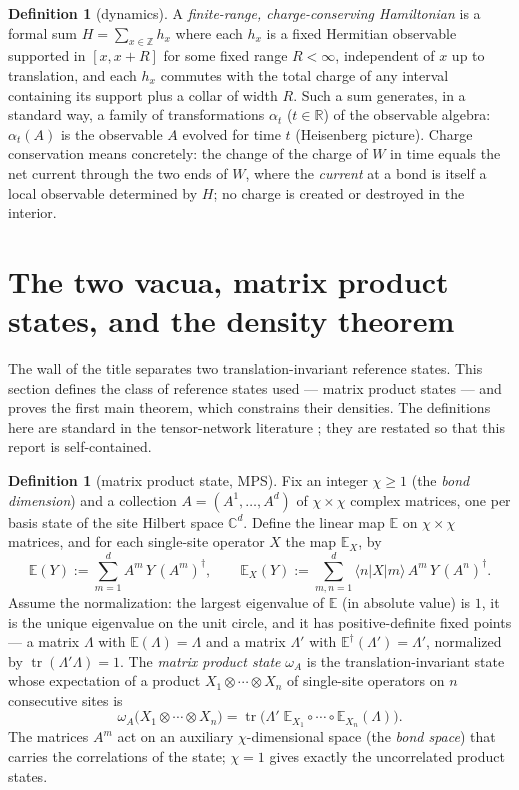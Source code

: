 \documentclass[11pt]{article}
\theoremstyle{definition}
\newtheorem{definition}[theorem]{Definition}
\theoremstyle{remark}
\newcommand{\Z}{\mathbb{Z}}
\newcommand{\R}{\mathbb{R}}
\newcommand{\C}{\mathbb{C}}
\newcommand{\tr}{\operatorname{tr}}
\begin{document}
\begin{definition}[dynamics]\label{def:dynamics}
A \emph{finite-range, charge-conserving Hamiltonian} is a formal sum
$H=\sum_{x\in\Z}h_x$ where each $h_x$ is a fixed Hermitian observable
supported in $[x,x+R]$ for some fixed range $R<\infty$, independent of $x$ up
to translation, and each $h_x$ commutes with the total charge of any interval
containing its support plus a collar of width $R$.  Such a sum generates, in a
standard way, a family of transformations $\alpha_t$ ($t\in\R$) of the
observable algebra: $\alpha_t(A)$ is the observable $A$ evolved for time $t$
(Heisenberg picture).  Charge conservation means concretely: the change of the
charge of $W$ in time equals the net current through the two ends of $W$,
where the \emph{current} at a bond is itself a local observable determined by
$H$; no charge is created or destroyed in the interior.
\end{definition}

\section{The two vacua, matrix product states, and the density theorem}
\label{sec:mps}

The wall of the title separates two translation-invariant reference states.
This section defines the class of reference states used --- matrix product
states --- and proves the first main theorem, which constrains their
densities.  The definitions here are standard in the tensor-network
literature \cite{cirac2021}; they are restated so that this report is
self-contained.

\begin{definition}[matrix product state, MPS]\label{def:mps}
Fix an integer $\chi\ge 1$ (the \emph{bond dimension}) and a collection
$A=(A^{1},\dots,A^{d})$ of $\chi\times\chi$ complex matrices, one per basis
state of the site Hilbert space $\C^d$.  Define the linear map
$\mathbb{E}$ on $\chi\times\chi$ matrices, and for each single-site operator
$X$ the map $\mathbb{E}_X$, by
\[
\mathbb{E}(Y):=\sum_{m=1}^{d}A^{m}\,Y\,(A^{m})^{\dagger},\qquad
\mathbb{E}_X(Y):=\sum_{m,n=1}^{d}\langle n|X|m\rangle\,A^{m}\,Y\,(A^{n})^{\dagger}.
\]
Assume the normalization: the largest eigenvalue of $\mathbb{E}$ (in absolute
value) is $1$, it is the unique eigenvalue on the unit circle, and it has
positive-definite fixed points --- a matrix $\Lambda$ with
$\mathbb{E}(\Lambda)=\Lambda$ and a matrix $\Lambda'$ with
$\mathbb{E}^{\dagger}(\Lambda')=\Lambda'$, normalized by
$\tr(\Lambda'\Lambda)=1$.  The \emph{matrix product state} $\omega_A$ is the
translation-invariant state whose expectation of a product
$X_{1}\otimes\cdots\otimes X_{n}$ of single-site operators on $n$ consecutive
sites is
\[
\omega_A\bigl(X_{1}\otimes\cdots\otimes X_{n}\bigr)
=\tr\bigl(\Lambda'\;\mathbb{E}_{X_{1}}\circ\cdots\circ\mathbb{E}_{X_{n}}(\Lambda)\bigr).
\]
The matrices $A^m$ act on an auxiliary $\chi$-dimensional space (the
\emph{bond space}) that carries the correlations of the state; $\chi=1$ gives
exactly the uncorrelated product states.
\end{definition}
\end{document}
